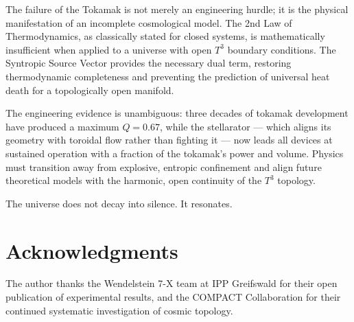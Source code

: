 \documentclass[aps,prd,11pt,onecolumn,superscriptaddress,nofootinbib,floatfix]{revtex4-2}
\begin{document}
The failure of the Tokamak is not merely an engineering hurdle; it is the physical manifestation of an incomplete cosmological model. The 2nd Law of Thermodynamics, as classically stated for closed systems, is mathematically insufficient when applied to a universe with open $T^3$ boundary conditions. The Syntropic Source Vector provides the necessary dual term, restoring thermodynamic completeness and preventing the prediction of universal heat death for a topologically open manifold.

The engineering evidence is unambiguous: three decades of tokamak development have produced a maximum $Q = 0.67$, while the stellarator --- which aligns its geometry with toroidal flow rather than fighting it --- now leads all devices at sustained operation with a fraction of the tokamak's power and volume. Physics must transition away from explosive, entropic confinement and align future theoretical models with the harmonic, open continuity of the $T^3$ topology.

The universe does not decay into silence. It resonates.

\section*{Acknowledgments}
The author thanks the Wendelstein 7-X team at IPP Greifswald for their open publication of experimental results, and the COMPACT Collaboration for their continued systematic investigation of cosmic topology.
\end{document}
